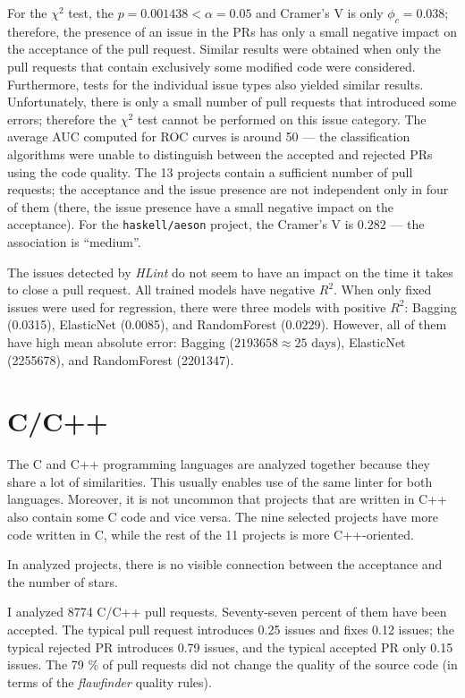 \documentclass[digital,oneside,oldtable,nolof,nolot,nocover]{fithesis4}
\begin{document}
For the \(\chi^2\) test, the \(p = 0.001438 < \alpha = 0.05\) and Cramer's V is only \(\phi_c = 0.038\);
therefore, the presence of an issue in the PRs has only a small negative impact on the
acceptance of the pull request. Similar results were obtained when only
the pull requests that contain exclusively some modified code were considered.
Furthermore, tests for the individual issue types also yielded similar results.
Unfortunately, there is only a small number of pull requests that introduced some errors;
therefore the \(\chi^2\) test cannot be performed on this issue category.
The average AUC computed for ROC curves is around 50 --- the classification algorithms
were unable to distinguish between the accepted and rejected PRs using the code quality.
The 13 projects contain a sufficient number of pull requests; the acceptance and
the issue presence are not independent only in four of them (there, the issue presence
have a small negative impact on the acceptance). For the \texttt{haskell/aeson} project,
the Cramer's V is \(0.282\) --- the association is ``medium''.

The issues detected by \emph{HLint} do not seem to have an impact on the time it takes to close a pull request.
All trained models have negative \(R^2\). When only fixed issues were used for regression, there
were three models with positive \(R^2\): Bagging (0.0315), ElasticNet (0.0085), and RandomForest (0.0229).
However, all of them have high mean absolute error: Bagging (\(2193658 \approx 25\text{ days}\)),
ElasticNet (2255678), and RandomForest (2201347).
\section{C/C++}
\label{sec:org6e9866a}
The C and C++ programming languages are analyzed together because they share
a lot of similarities.  This usually enables use of the same linter for both
languages. Moreover, it is not uncommon that projects that are written in C++
also contain some C code and vice versa.  The nine selected projects have more
code written in C, while the rest of the 11 projects is more C++-oriented.

In analyzed projects, there is no visible connection between the acceptance
and the number of stars.

I analyzed 8774 C/C++ pull requests. Seventy-seven percent of them have been accepted.
The typical pull request introduces 0.25 issues and fixes 0.12 issues; the typical
rejected PR introduces 0.79 issues, and the typical accepted PR only 0.15 issues.
The 79 \% of pull requests did not change the quality of the source code
(in terms of the \emph{flawfinder} quality rules).
\end{document}
